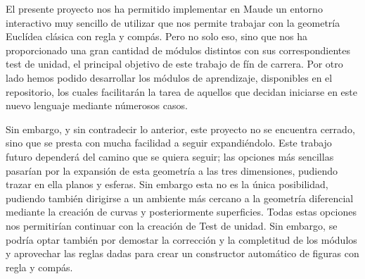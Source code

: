 
El presente proyecto nos ha permitido implementar en Maude un entorno interactivo muy sencillo de utilizar que nos permite trabajar con la geometría Euclídea clásica con regla y compás. Pero no solo eso, sino que nos ha proporcionado una gran cantidad de módulos distintos con sus correspondientes test de unidad, el principal objetivo de este trabajo de fín de carrera. Por otro lado hemos podido desarrollar los módulos de aprendizaje, disponibles en el repositorio, los cuales facilitarán la tarea de aquellos que decidan iniciarse en este nuevo lenguaje mediante númerosos casos. \par

Sin embargo, y sin contradecir lo anterior, este proyecto no se encuentra cerrado, sino que se presta con mucha facilidad a seguir expandiéndolo. Este trabajo futuro dependerá del camino que se quiera seguir; las opciones más sencillas pasarían por la expansión de esta geometría a las tres dimensiones, pudiendo trazar en ella planos y esferas. Sin embargo esta no es la única posibilidad, pudiendo también dirigirse a un ambiente más cercano a la geometría diferencial mediante la creación de curvas y posteriormente superficies. Todas estas opciones nos permitirían continuar con la creación de Test de unidad. Sin embargo, se podría optar también por demostar la corrección y la completitud de los módulos y aprovechar las reglas dadas para crear un constructor automático de figuras con regla y compás.
